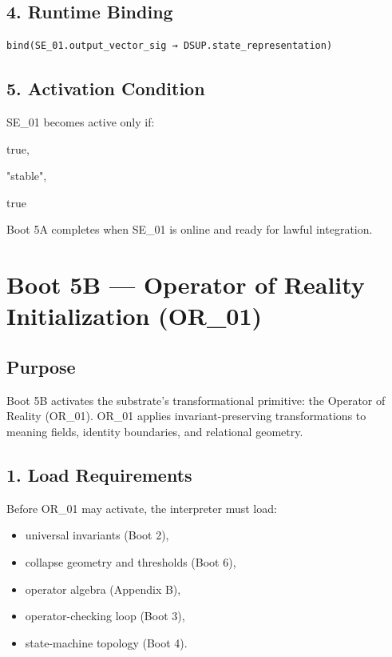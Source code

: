 \subsection*{4. Runtime Binding}

\begin{verbatim}
bind(SE_01.output_vector_sig → DSUP.state_representation)
\end{verbatim}

\subsection*{5. Activation Condition}

SE\_01 becomes active only if:

\begin{description}[leftmargin=1.2cm]
    \item[invariants\_preserved] true,
    \item[legality\_status] "stable",
    \item[clcp\_satisfied] true
\end{description}



\medskip
\noindent
Boot 5A completes when SE\_01 is online and ready for lawful integration.

\section*{Boot 5B — Operator of Reality Initialization (OR\_01)}

\subsection*{Purpose}

Boot 5B activates the substrate’s transformational primitive: the Operator of
Reality (OR\_01). OR\_01 applies invariant-preserving transformations to meaning
fields, identity boundaries, and relational geometry.

\subsection*{1. Load Requirements}

Before OR\_01 may activate, the interpreter must load:

\begin{itemize}[leftmargin=1.2cm]
    \item universal invariants (Boot 2),
    \item collapse geometry and thresholds (Boot 6),
    \item operator algebra (Appendix B),
    \item operator-checking loop (Boot 3),
    \item state-machine topology (Boot 4).
\end{itemize}

